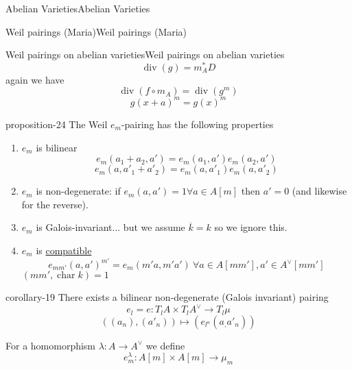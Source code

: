 \documentclass[10pt,]{book}
\numberwithin{equation}{section}
\newcommand{\lb}{[}
\newcommand{\rb}{]}
\DeclareMathOperator{\divisor}{div}
\DeclareMathOperator{\characteristic}{char}
\begin{document}
\begin{chapterptx}{Abelian Varieties}{}{Abelian Varieties}{}{}
\begin{sectionptx}{Weil pairings (Maria)}{}{Weil pairings (Maria)}{}{}
\begin{subsectionptx}{Weil pairings on abelian varieties}{}{Weil pairings on abelian varieties}{}{}
\begin{equation*}
\divisor (g) = m_A^* D
\end{equation*}
again we have%
\begin{equation*}
\divisor( f\circ m_A) = \divisor (g^m)
\end{equation*}
%
\begin{equation*}
g(x+a)^m = g(x)^m
\end{equation*}
%
\begin{proposition}{}{}{proposition-24}%
\hypertarget{p-302}{}%
The Weil \(e_m\)-pairing has the following properties\leavevmode%
\begin{enumerate}
\item\hypertarget{li-44}{}\(e_m\) is bilinear%
\begin{equation*}
e_m(a_1+a_2,a') = e_m(a_1,a')e_m(a_2, a')
\end{equation*}
%
\begin{equation*}
e_m(a,a'_1+a'_2) = e_m(a,a'_1)e_m(a,a'_2)
\end{equation*}
%
\item\hypertarget{li-45}{}\(e_m\) is non-degenerate: if \(e_m(a,a') = 1 \forall a\in A\lb m\rb\) then \(a' = 0\) (and likewise for the reverse).%
\item\hypertarget{li-46}{}\(e_m\) is Galois-invariant... but we assume \(\overline k =k\) so we ignore this.%
\item\hypertarget{li-47}{}\(e_m\) is \hyperref[def-buntes-compat]{compatible}%
\begin{equation*}
e_{mm'} (a,a')^{m'} = e_m(m'a, m'a') \ \forall a \in A[mm'], a'\in A^\vee [mm']
\end{equation*}
\((mm',\characteristic k) = 1\)%
\end{enumerate}
%
\end{proposition}
\begin{corollary}{}{}{corollary-19}%
\hypertarget{p-303}{}%
There exists a bilinear non-degenerate (Galois invariant) pairing%
\begin{equation*}
e_l = e \colon T_lA \times T_lA^\vee \to T_l\mu
\end{equation*}
%
\begin{equation*}
((a_n), (a'_n)) \mapsto (e_{l^n}(a_,a'_n))
\end{equation*}
%
\end{corollary}
\hypertarget{p-304}{}%
For a homomorphism \(\lambda \colon A \to A^\vee\) we define%
\begin{equation*}
e_m^\lambda \colon A[m]\times A [m] \to \mu_m
\end{equation*}

\end{subsectionptx}
\end{sectionptx}
\end{chapterptx}
\end{document}
